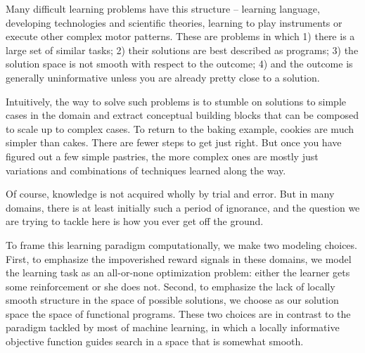 \documentclass{article}
\begin{document}
Many difficult learning problems have this structure -- learning
language, developing technologies and scientific theories, learning to
play instruments or execute other complex motor patterns. These are
problems in which 1) there is a large set of similar tasks; 2) their
solutions are best described as programs; 3) the solution space is
not smooth with respect to the outcome; 4) and the outcome is generally
uninformative unless you are already pretty close to a solution.

Intuitively, the way to solve such problems is to stumble on solutions
to simple cases in the domain and extract conceptual building blocks
that can be composed to scale up to complex cases. To return to the
baking example, cookies are much simpler than cakes. There are fewer
steps to get just right. But once you have figured out a few simple
pastries, the more complex ones are mostly just variations and
combinations of techniques learned along the way. 

Of course, knowledge is not acquired wholly by trial and error. But in
many domains, there is at least initially such a period of ignorance,
and the question we are trying to tackle here is how you ever get off
the ground.

To frame this learning paradigm computationally, we make two modeling
choices. First, to emphasize the impoverished reward signals in these
domains, we model the learning task as an all-or-none optimization
problem: either the learner gets some reinforcement or she does
not. Second, to emphasize the lack of locally smooth structure in the
space of possible solutions, we choose as our solution space the space
of functional programs. These two choices are in contrast to the
paradigm tackled by most of machine learning, in which a locally
informative objective function guides search in a space that is
somewhat smooth.

\end{document}
